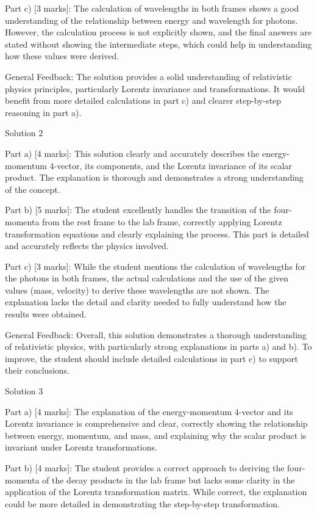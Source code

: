 \documentclass[a4paper,11pt]{article}
\begin{document}
Part c) [3 marks]: The calculation of wavelengths in both frames shows a good understanding of the relationship between energy and wavelength for photons. However, the calculation process is not explicitly shown, and the final answers are stated without showing the intermediate steps, which could help in understanding how these values were derived.

General Feedback: The solution provides a solid understanding of relativistic physics principles, particularly Lorentz invariance and transformations. It would benefit from more detailed calculations in part c) and clearer step-by-step reasoning in part a).

Solution 2

Part a) [4 marks]: This solution clearly and accurately describes the energy-momentum 4-vector, its components, and the Lorentz invariance of its scalar product. The explanation is thorough and demonstrates a strong understanding of the concept.

Part b) [5 marks]: The student excellently handles the transition of the four-momenta from the rest frame to the lab frame, correctly applying Lorentz transformation equations and clearly explaining the process. This part is detailed and accurately reflects the physics involved.

Part c) [3 marks]: While the student mentions the calculation of wavelengths for the photons in both frames, the actual calculations and the use of the given values (mass, velocity) to derive these wavelengths are not shown. The explanation lacks the detail and clarity needed to fully understand how the results were obtained.

General Feedback: Overall, this solution demonstrates a thorough understanding of relativistic physics, with particularly strong explanations in parts a) and b). To improve, the student should include detailed calculations in part c) to support their conclusions.

Solution 3

Part a) [4 marks]: The explanation of the energy-momentum 4-vector and its Lorentz invariance is comprehensive and clear, correctly showing the relationship between energy, momentum, and mass, and explaining why the scalar product is invariant under Lorentz transformations.

Part b) [4 marks]: The student provides a correct approach to deriving the four-momenta of the decay products in the lab frame but lacks some clarity in the application of the Lorentz transformation matrix. While correct, the explanation could be more detailed in demonstrating the step-by-step transformation.
\end{document}
